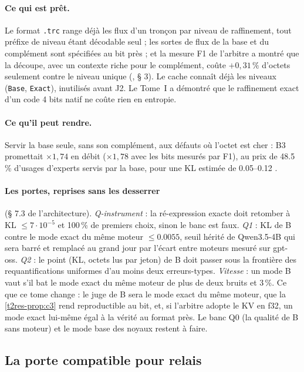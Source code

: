 \paragraph{Ce qui est prêt.} Le format \texttt{.trc} range déjà les flux d'un tronçon par niveau de raffinement, tout préfixe de niveau étant décodable seul ; les sortes de flux de la base et du complément sont spécifiées au bit près ; et la mesure F1 de l'arbitre a montré que la découpe, avec un contexte riche pour le complément, coûte $+0{,}31\,\%$ d'octets seulement contre le niveau unique (, § 3). Le cache connaît déjà les niveaux (\texttt{Base}, \texttt{Exact}), inutilisés avant J2. Le Tome~I a démontré que le raffinement exact d'un code 4 bits natif ne coûte rien en entropie.

\paragraph{Ce qu'il peut rendre.} Servir la base seule, sans son complément, aux défauts où l'octet est cher : B3 promettait $\times 1{,}74$ en débit ($\times 1{,}78$ avec les bits mesurés par F1), au prix de \num{48.5}\,\% d'usages d'experts servis par la base, pour une KL estimée de \numrange{0.05}{0.12} \calc.

\paragraph{Les portes, reprises sans les desserrer} (§ 7.3 de l'architecture). \emph{Q-instrument} : la ré-expression exacte doit retomber à KL $\le 7\cdot10^{-5}$ et \num{100}\,\% de premiers choix, sinon le banc est faux. \emph{Q1} : KL de B contre le mode exact du même moteur $\le \num{0.0055}$, seuil hérité de Qwen3.5-4B qui sera barré et remplacé au grand jour par l'écart entre moteurs mesuré sur gpt-oss. \emph{Q2} : le point (KL, octets lus par jeton) de B doit passer sous la frontière des requantifications uniformes d'au moins deux erreurs-types. \emph{Vitesse} : un mode B vaut s'il bat le mode exact du même moteur de plus de deux bruits et 3\,\%. Ce que ce tome change : le juge de B sera le mode exact du même moteur, que la \cref{t2res-prop:c3} rend reproductible au bit, et, si l'arbitre adopte le KV en f32, un mode exact lui-même égal à la vérité au format près. Le banc Q0 (la qualité de B sans moteur) et le mode base des noyaux restent à faire.

\subsection{La porte compatible pour relais}\label{t2d-sec:relais}

